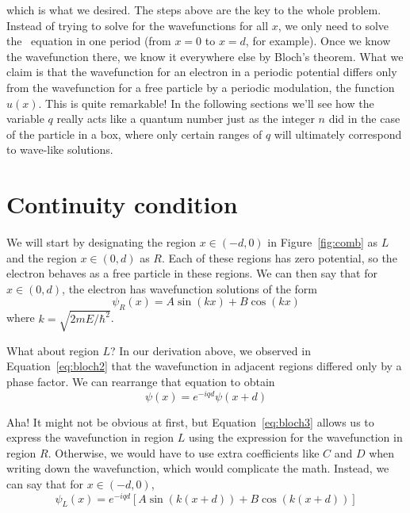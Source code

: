 which is what we desired. The steps above are the key to the whole problem. Instead of trying to solve for the wavefunctions for all $x$, we only need to solve the \Sch\ equation in one period (from $x=0$ to $x=d$, for example). Once we know the wavefunction there, we know it everywhere else by Bloch's theorem. What we claim is that the wavefunction for an electron in a periodic potential differs only from the wavefunction for a free particle by a periodic modulation, the function $u(x)$. This is quite remarkable! In the following sections we'll see how the variable $q$ really acts like a quantum number just as the integer $n$ did in the case of the particle in a box, where only certain ranges of $q$ will ultimately correspond to wave-like solutions.


\section{Continuity condition}
We will start by designating the region $x \in (-d,0)$ in Figure~\ref{fig:comb} as $L$ and the region $x \in (0,d)$ as $R$. Each of these regions has zero potential, so the electron behaves as a free particle in these regions. We can then say that for $x \in (0,d)$, the electron has wavefunction solutions of the form 
\begin{equation}
	\psi_R(x) = A\sin(kx) + B\cos(kx) \label{eq:kpr}
\end{equation}
where $k = \sqrt{2mE/\hbar^2}$. \par 

What about region $L$? In our derivation above, we observed in Equation~\ref{eq:bloch2} that the wavefunction in adjacent regions differed only by a phase factor. We can rearrange that equation to obtain
\begin{equation}
	\psi(x) = e^{-iqd}\psi(x+d) \label{eq:bloch3}
\end{equation}

Aha! It might not be obvious at first, but Equation~\ref{eq:bloch3} allows us to express the wavefunction in region $L$ using the expression for the wavefunction in region $R$. Otherwise, we would have to use extra coefficients like $C$ and $D$ when writing down the wavefunction, which would complicate the math. Instead, we can say that for $x \in (-d,0)$, 
\begin{equation}
	\psi_L(x) = e^{-iqd}\left[A\sin(k(x+d)) + B\cos(k(x+d))\right] \label{eq:kpl}
\end{equation}

